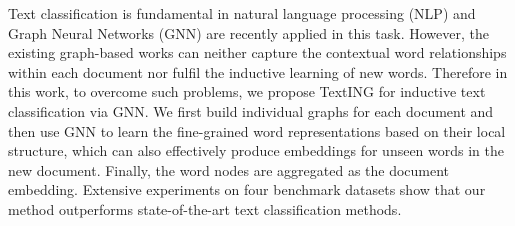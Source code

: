 Text classification is fundamental in natural language processing (NLP) and Graph Neural Networks (GNN) are recently applied in this task. However, the existing graph-based works can neither capture the contextual word relationships within each document nor fulfil the inductive learning of new words. Therefore in this work, to overcome such problems, we propose TextING for inductive text classification via GNN. We first build individual graphs for each document and then use GNN to learn the fine-grained word representations based on their local structure, which can also effectively produce embeddings for unseen words in the new document. Finally, the word nodes are aggregated as the document embedding. Extensive experiments on four benchmark datasets show that our method outperforms state-of-the-art text classification methods.
